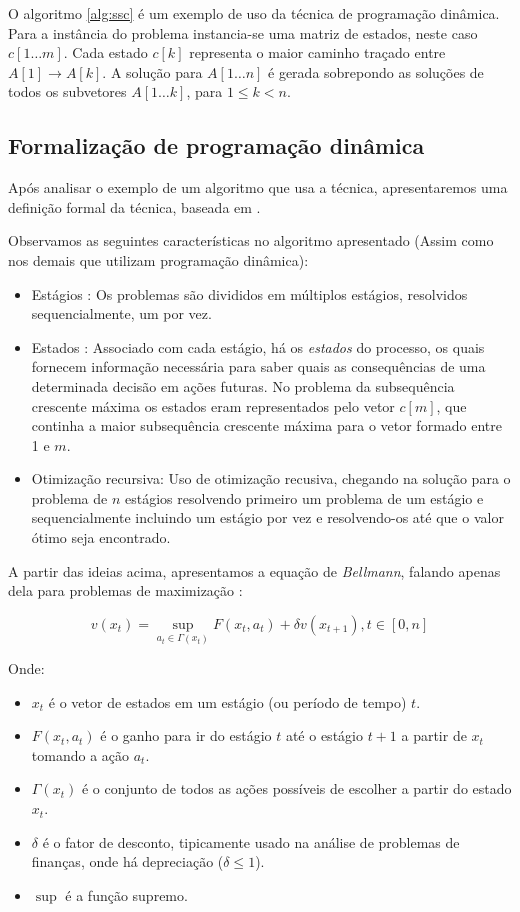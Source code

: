 O algoritmo \ref{alg:ssc} é um exemplo de uso da técnica de programação dinâmica. Para a instância do problema instancia-se uma matriz de estados, neste caso $c[ 1 \ldots m]$. Cada estado $c[k]$ representa o maior caminho traçado entre $A[1] \rightarrow A[k]$. A solução para $A[1 \ldots n]$ é gerada sobrepondo as soluções de todos os subvetores $A[1 \ldots k]$, para $1 \leq k < n$.

\subsection{Formalização de programação dinâmica}

Após analisar o exemplo de um algoritmo que usa a técnica, apresentaremos uma definição formal da técnica, baseada em \cite{Bradley}.

Observamos as seguintes características no algoritmo apresentado (Assim como nos demais que utilizam programação dinâmica):

\begin{itemize}
\item Estágios : Os problemas são divididos em múltiplos estágios, resolvidos sequencialmente, um por vez.
\item Estados : Associado com cada estágio, há os \textit{estados} do processo, os quais fornecem informação necessária para saber quais as consequências de uma determinada decisão em ações futuras. No problema da subsequência crescente máxima os estados eram representados pelo vetor $c[m]$, que continha a maior subsequência crescente máxima para o vetor formado entre 1 e $m$.
\item Otimização recursiva: Uso de otimização recusiva, chegando na solução para o problema de $n$ estágios resolvendo primeiro um problema de um estágio e sequencialmente incluindo um estágio por vez e resolvendo-os até que o valor ótimo seja encontrado.
\end{itemize}

A partir das ideias acima, apresentamos a equação de \textit{Bellmann}, falando apenas dela para problemas de maximização \cite{laibson}:

\begin{equation}
\label{equ:bellmann}
v(x_t) = \sup_{a_t \in \Gamma(x_t)} { F(x_t,a_t) + \delta v (x_{t+1}) }, t \in [0,n]
\end{equation}

Onde:

\begin{itemize}
\item $x_t$ é o vetor de estados em um estágio (ou período de tempo) $t$.
\item $F(x_t, a_t)$ é o ganho para ir do estágio $t$ até o estágio $t+1$ a partir de $x_t$ tomando a ação $a_t$.
\item $\Gamma(x_t)$ é o conjunto de todos as ações possíveis de escolher a partir do estado $x_t$.
\item $\delta$ é o fator de desconto, tipicamente usado na análise de problemas de finanças, onde há depreciação ($\delta \leq 1$).
\item $\sup{}{}$ é a função supremo.
\end{itemize}


